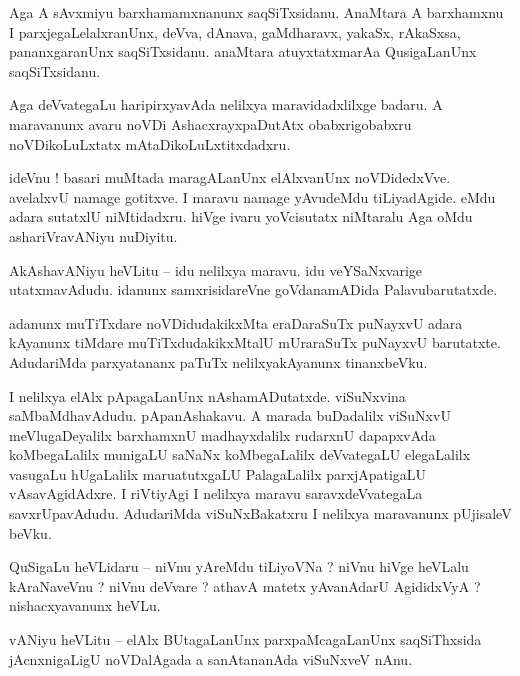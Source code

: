 \documentclass{article}
\begin{document}
\begin{mn}%
Aga A sAvxmiyu barxhamamxnanunx saqSiTxsidanu. AnaMtara A barxhamxnu I parxjegaLelalxranUnx, deVva, 
dAnava, gaMdharavx, yakaSx, rAkaSxsa, pananxgaranUnx saqSiTxsidanu. anaMtara atuyxtatxmarAa 
QusigaLanUnx saqSiTxsidanu.
\end{mn}

\begin{mn}%
Aga deVvategaLu haripirxyavAda nelilxya maravidadxlilxge badaru. A maravanunx avaru noVDi 
AshacxrayxpaDutAtx obabxrigobabxru noVDikoLuLxtatx mAtaDikoLuLxtitxdadxru.
\end{mn}

\begin{mn}%
ideVnu ! basari muMtada maragALanUnx elAlxvanUnx noVDidedxVve. avelalxvU namage gotitxve. I maravu 
namage yAvudeMdu tiLiyadAgide. eMdu adara sutatxlU niMtidadxru. hiVge ivaru yoVcisutatx niMtaralu 
Aga oMdu ashariVravANiyu nuDiyitu.
\end{mn}

\begin{mn}%
AkAshavANiyu heVLitu -- idu nelilxya maravu. idu veYSaNxvarige utatxmavAdudu. idanunx 
samxrisidareVne goVdanamADida Palavubarutatxde.
\end{mn}

\begin{mn}%
adanunx muTiTxdare noVDidudakikxMta eraDaraSuTx puNayxvU adara kAyanunx tiMdare muTiTxdudakikxMtalU 
mUraraSuTx puNayxvU barutatxte. AdudariMda parxyatananx paTuTx nelilxyakAyanunx tinanxbeVku.
\end{mn}

\begin{mn}%
I nelilxya  elAlx pApagaLanUnx nAshamADutatxde. viSuNxvina saMbaMdhavAdudu. pApanAshakavu. A marada 
buDadalilx viSuNxvU meVlugaDeyalilx barxhamxnU madhayxdalilx rudarxnU dapapxvAda koMbegaLalilx 
munigaLU saNaNx koMbegaLalilx deVvategaLU elegaLalilx vasugaLu hUgaLalilx maruatutxgaLU 
PalagaLalilx parxjApatigaLU vAsavAgidAdxre. I riVtiyAgi I nelilxya maravu saravxdeVvategaLa 
savxrUpavAdudu. AdudariMda viSuNxBakatxru I nelilxya maravanunx pUjisaleV beVku.
\end{mn}

\begin{mn}%
QuSigaLu heVLidaru -- niVnu yAreMdu tiLiyoVNa ? niVnu hiVge heVLalu kAraNaveVnu ? niVnu deVvare ? 
athavA matetx yAvanAdarU AgididxVyA ? nishacxyavanunx heVLu.
\end{mn}

\begin{mn}%
vANiyu heVLitu -- elAlx BUtagaLanUnx parxpaMcagaLanUnx saqSiThxsida jAcnxnigaLigU noVDalAgada a 
sanAtananAda viSuNxveV nAnu.
\end{mn}
\end{document}
